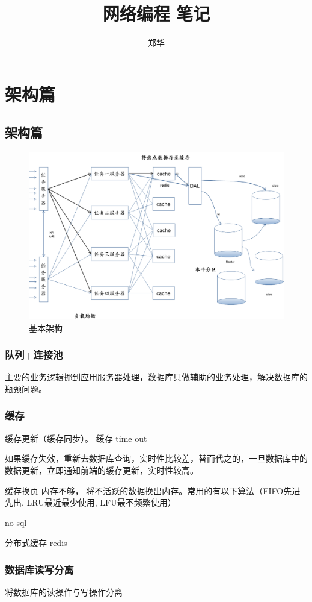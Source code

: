 \documentclass[UTF8,a4paper,8pt]{ctexbook}
\author{\kaishu 郑华}
\title{\heiti 网络编程 笔记}
\begin{document}
 	\maketitle
 	\tableofcontents
\chapter{架构篇}
	 \section{架构篇}
		\begin{figure}[ht]
			\centering
			\includegraphics[width=0.8\linewidth]{server-Arch}
			\caption{基本架构}
			\label{fig:server-arch}
		\end{figure}
		 
		\subsection{队列+连接池}
			主要的业务逻辑挪到应用服务器处理，数据库只做辅助的业务处理，解决数据库的瓶颈问题。
		
		\subsection{缓存}
			缓存更新（缓存同步）。 缓存 time out
			
			如果缓存失效，重新去数据库查询，实时性比较差，替而代之的，一旦数据库中的数据更新，立即通知前端的缓存更新，实时性较高。
			
			缓存换页  内存不够， 将不活跃的数据换出内存。常用的有以下算法（FIFO先进先出, LRU最近最少使用, LFU最不频繁使用）
			
			no-sql
			
			分布式缓存-redis 
		\subsection{数据库读写分离}
			将数据库的读操作与写操作分离
			
\end{document}
